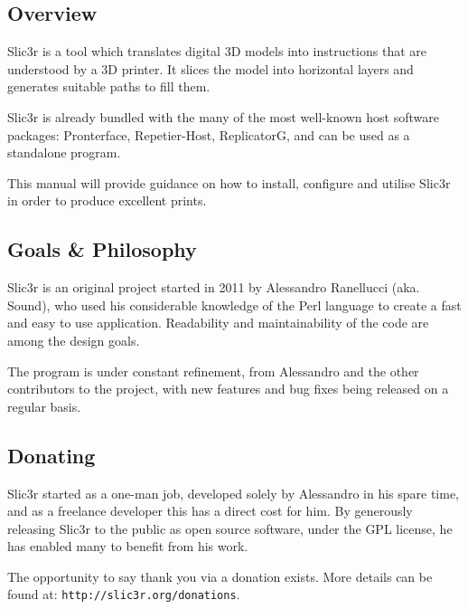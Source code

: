 \subsection{Overview}
Slic3r is a tool which translates digital 3D models into instructions that are understood by a 3D printer.  It slices the model into horizontal layers and generates suitable paths to fill them.

Slic3r is already bundled with the many of the most well-known host software packages: Pronterface, Repetier-Host, ReplicatorG, and can be used as a standalone program.

This manual will provide guidance on how to install, configure and utilise Slic3r in order to produce excellent prints.


\subsection{Goals \& Philosophy}
Slic3r is an original project started in 2011 by Alessandro Ranellucci (aka. Sound), who used his considerable knowledge of the Perl language to create a fast and easy to use application.  Readability and maintainability of the code are among the design goals.

The program is under constant refinement, from Alessandro and the other contributors to the project, with new features and bug fixes being released on a regular basis.


\subsection{Donating}
Slic3r started as a one-man job, developed solely by Alessandro in his spare time, and as a freelance developer this has a direct cost for him.  By generously releasing Slic3r to the public as open source software, under the GPL license, he has enabled many to benefit from his work.

The opportunity to say thank you via a donation exists.  More details can be found at: \texttt{http://slic3r.org/donations}.
